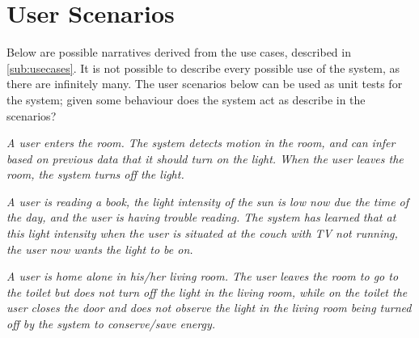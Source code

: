 \section{User Scenarios}\label{sub:userscenarios}

Below are possible narratives derived from the use cases, described in \cref{sub:usecases}. It is not possible to describe every possible use of the system, as there are infinitely many.
The user scenarios below can be used as unit tests for the system; given some behaviour does the system act as describe in the scenarios?

\textit{A user enters the room. The system detects motion in the room, and can infer based on previous data that it should turn on the light. When the user leaves the room, the system turns off the light.}

\textit{A user is reading a book, the light intensity of the sun is low now due the time of the day, and the user is having trouble reading. The system has learned that at this light intensity when the user is situated at the couch with TV not running, the user now wants the light to be on.}

\textit{A user is home alone in his/her living room. The user leaves the room to go to the toilet but does not turn off the light in the living room, while on the toilet the user closes the door and does not observe the light in the living room being turned off by the system to conserve/save energy.}

